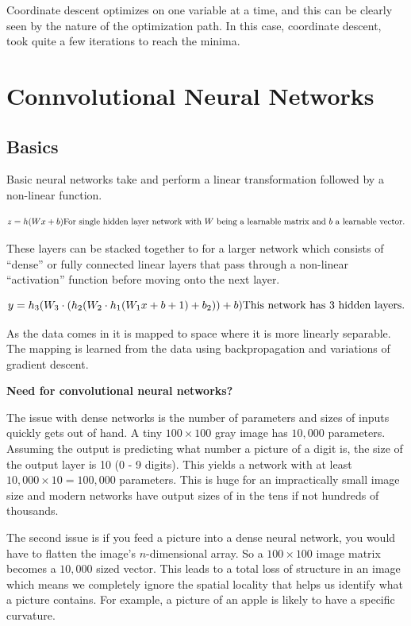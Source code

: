 \documentclass[
]{article}
\begin{document}
Coordinate descent optimizes on one variable at a time, and this can be clearly seen by the nature of the optimization path. In this case, coordinate descent, took quite a few iterations to reach the minima.

\section{Connvolutional Neural Networks}\label{connvolutional-neural-networks}

\subsection{Basics}\label{basics}

Basic neural networks take and perform a linear transformation followed by a non-linear function.

\[
z = h(Wx + b)\\
\text{For single hidden layer network with } W \text{ being a learnable matrix and } b \text{ a learnable vector.}
\]

These layers can be stacked together to for a larger network which consists of ``dense'' or fully connected linear layers that pass through a non-linear ``activation'' function before moving onto the next layer.

\[
y = h_3(W_3 \cdot (h_2(W_2 \cdot h_1(W_1 x + b+1) + b_2)) + b)\\
\text{This network has 3 hidden layers.}
\]

As the data comes in it is mapped to space where it is more linearly separable. The mapping is learned from the data using backpropagation and variations of gradient descent.

\textbf{Need for convolutional neural networks?}

The issue with dense networks is the number of parameters and sizes of inputs quickly gets out of hand. A tiny \(100 \times 100\) gray image has \(10,000\) parameters. Assuming the output is predicting what number a picture of a digit is, the size of the output layer is 10 (0 - 9 digits). This yields a network with at least \(10,000 \times 10 = 100, 000\) parameters. This is huge for an impractically small image size and modern networks have output sizes of in the tens if not hundreds of thousands.

The second issue is if you feed a picture into a dense neural network, you would have to flatten the image's \(n\)-dimensional array. So a \(100 \times 100\) image matrix becomes a \(10,000\) sized vector. This leads to a total loss of structure in an image which means we completely ignore the spatial locality that helps us identify what a picture contains. For example, a picture of an apple is likely to have a specific curvature.
\end{document}
